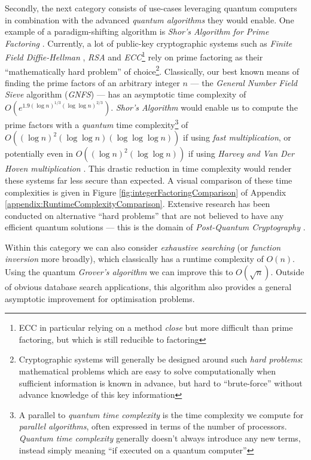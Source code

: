 \documentclass[conference]{IEEEtran}
\begin{document}
Secondly, the next category consists of use-cases leveraging quantum computers in combination with the
advanced \textit{quantum algorithms} they would enable. %
One example of a paradigm-shifting algorithm is
\textit{Shor's Algorithm for Prime Factoring} \cite{ref:shorsalgorithm}.
Currently, a lot of public-key cryptographic systems
such as  \textit{Finite Field Diffie-Hellman} \cite{ref:rfc7919},
\textit{RSA} \cite{ref:rsapaper} and
\textit{ECC}\footnote{ECC in particular relying on a method \textit{close} but more difficult than prime factoring,
but which is still reducible to factoring\cite{ref:quantumcomputingsincedemocritus,ref:ellipticcurves1986}}
rely on prime factoring
as their ``mathematically hard problem'' of
choice\footnote{Cryptographic systems will generally be designed around such \textit{hard
problems}: mathematical problems which are easy to solve computationally when sufficient information is known in advance,
but hard to ``brute-force'' without advance knowledge of this key information}.
Classically, our best known means of finding the prime factors
of an arbitrary integer $n$
— the \textit{General Number Field Sieve} algorithm (\textit{GNFS})\cite{ref:wikipediaGNFS} —
has an asymptotic time complexity of $O(e^{1.9(\log{n})^{1/3}(\log{\log{n}})^{2/3}})$.
\textit{Shor's Algorithm} would enable us to compute the prime factors with a \textit{quantum} time
complexity\footnote{A parallel to \textit{quantum time complexity} is the time complexity we compute for \textit{parallel algorithms},
often expressed in terms of the number of processors. \textit{Quantum time complexity} generally doesn't always introduce any new terms, instead simply meaning ``if executed on a quantum computer''}
of $O((\log{n})^2(\log{\log{n}})(\log{\log{\log{n}}}))$ if using \textit{fast multiplication},
or potentially even in $O((\log{n})^2(\log{\log{n}}))$ if using \textit{Harvey and Van Der Hoven multiplication}
\cite{ref:harvey2021integer}.
This drastic reduction in time complexity would render these systems far less secure than expected.
A visual comparison of these time complexities is given in Figure \ref{fig:integerFactoringComparison} of Appendix \ref{appendix:RuntimeComplexityComparison}.
Extensive research has been conducted on alternative ``hard problems''
that are not believed to have any efficient quantum solutions — this is the domain of \textit{Post-Quantum Cryptography} \cite{ref:bernstein2017post}.

Within this category we can also consider \textit{exhaustive searching} (or \textit{function inversion} more broadly),
which classically has a runtime complexity of $O(n)$. Using the quantum \textit{Grover's algorithm} \cite{ref:grover1996fast} we can improve this to $O(\sqrt{n})$.
Outside of obvious database search applications, this algorithm also provides a general asymptotic improvement for optimisation problems.
\end{document}
